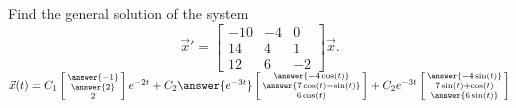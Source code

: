 \documentclass{ximera}
\begin{document}
\begin{exercise}%
    Find the general solution of the system
    \begin{equation*}
        {\vec{x}}' = 
        \begin{bmatrix} 
            -10 & -4 & 0 \\ 
            14 & 4 & 1 \\ 
            12 & 6 & -2 
        \end{bmatrix} \vec{x}.
    \end{equation*}
    $\vec{x}(t) = C_1\left[\begin{smallmatrix} \answer{-1} \\ \answer{2} \\ 2 \end{smallmatrix}\right]e^{-2t} + C_2\answer{e^{-3t}} \left[\begin{smallmatrix} \answer{-4\cos(t)} \\ \answer{7\cos(t) - \sin(t)} \\ 6\cos(t)  \end{smallmatrix}\right] + C_2e^{-3t}\left[\begin{smallmatrix} \answer{-4\sin(t)} \\ 7\sin(t) + \cos(t) \\ \answer{6\sin(t)} \end{smallmatrix}\right]$
\end{exercise}
\end{document}
